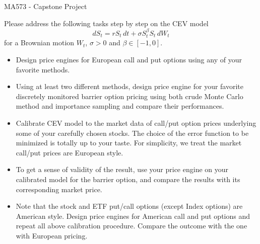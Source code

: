 \documentclass{article}
\begin{document}
\begin{center}
 MA573 - Capstone Project
\end{center}

Please address the following tasks step by step on the CEV model
	\[
	dS_t = rS_t \, dt + \sigma S_t^\beta S_t \, dW_t
	\]
	for a Brownian motion $W_t$, $\sigma > 0$ and $\beta \in [-1,0]$. 
	

\begin{itemize}
\item Design price engines for European call and put options using 
any of your favorite methods. 
\item Using at least two different methods, 
design price engine for your favorite discretely monitored 
barrier option pricing using both crude Monte Carlo method 
and  importance sampling and compare their performances. 

\item Calibrate CEV model to the 
market data of call/put option prices 
underlying some of your carefully chosen stocks.
The choice of the error function to be minimized is totally up to your taste.
For simplicity, we treat the market call/put prices are European style.

\item 
To get a sense of validity of the result, use your price engine on your calibrated model 
for the barrier option, and compare the results 
with its corresponding market price. 

\item Note that the stock and ETF put/call options (except Index options) are American style. Design price engines for American call and put options and repeat all above calibration procedure.
Compare the outcome with the one with European pricing.

\end{itemize}
\end{document}
